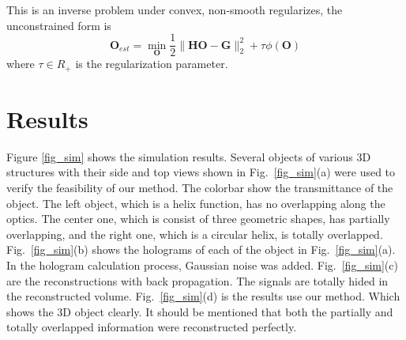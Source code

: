 \documentclass[9pt,twocolumn,twoside]{osajnl}
\begin{document}
This is an inverse problem under convex, non-smooth regularizes, the unconstrained form is
\begin{equation}
\mathbf{O}_{est} = \min_\mathbf{O} \frac{1}{2} \lVert \mathbf{H}\mathbf{O} - \mathbf{G} \rVert _2^2  + \tau \phi(\mathbf{O})
\label{eq_3dholo}
\end{equation}
where $\tau \in R_+$ is the regularization parameter.



%
%

\section{Results}\label{sec_results}

Figure \ref{fig_sim} shows the simulation results. 
Several objects of various 3D structures with their side and top views shown in Fig.~\ref{fig_sim}(a) were used to verify the feasibility of our method. The colorbar show the transmittance of the object. The left object, which is a helix function, has no overlapping along the optics. The center one, which is consist of three geometric shapes, has partially overlapping, and the right one, which is a circular helix, is totally overlapped. 
Fig.~\ref{fig_sim}(b) shows the holograms of each of the object in Fig.~\ref{fig_sim}(a). In the hologram calculation process, Gaussian noise was added.
Fig.~\ref{fig_sim}(c) are the reconstructions with back propagation. The signals are totally hided in the reconstructed volume.
Fig.~\ref{fig_sim}(d) is the results use our method. Which shows the 3D object clearly. It should be mentioned that both the partially and totally overlapped information were reconstructed perfectly.
\end{document}
